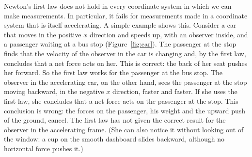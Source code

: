\documentclass[11pt,a4paper]{article}
\begin{document}
Newton's first law does not hold in every coordinate system in which we can make measurements. In
particular, it fails for measurements made in a coordinate system that is itself accelerating. A
simple example shows this. Consider a car that moves in the positive $x$ direction and speeds up,
with an observer inside, and a passenger waiting at a bus stop (Figure~\ref{fig:car}). The
passenger at the stop finds that the velocity of the observer in the car is changing and, by the
first law, concludes that a net force acts on her. This is correct: the back of her seat
pushes her forward. So the first law works for the passenger at the bus stop. The observer in the
accelerating car, on the other hand, sees the passenger at the stop moving backward, in the
negative $x$ direction, faster and faster. If she uses the first law, she concludes that a net
force acts on the passenger at the stop. This conclusion is wrong: the forces on the passenger, his
weight and the upward push of the ground, cancel. The first law has not given the correct result
for the observer in the accelerating frame. (She can also notice it without looking out of the
window: a cup on the smooth dashboard slides backward, although no horizontal force pushes it.)
\end{document}
